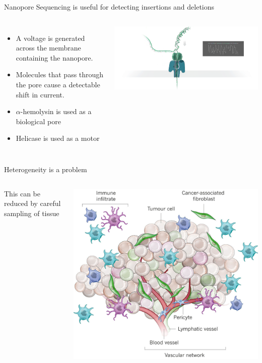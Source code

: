 \documentclass{beamer}
\begin{document}
\begin{frame}{Nanopore Sequencing is useful for detecting insertions and deletions}
\begin{columns}
\begin{itemize}
\item{A voltage is generated across the membrane containing the nanopore.}
\item{Molecules that pass through the pore cause a detectable shift in current.}
\item{$\alpha$-hemolysin is used as a biological pore}
\item{Helicase is used as a motor}
\end{itemize}
\includegraphics[width=\linewidth,trim={6cm 0 3cm 0},clip]{nanopore_seq-0.png}
\end{columns}
\end{frame}


\begin{frame}{Heterogeneity is a problem}
\begin{columns}
This can be reduced by careful sampling of tissue

\includegraphics[width=\linewidth]{junttila_2013_heterogeneity.jpg}
\end{columns}
\end{frame}
\end{document}

